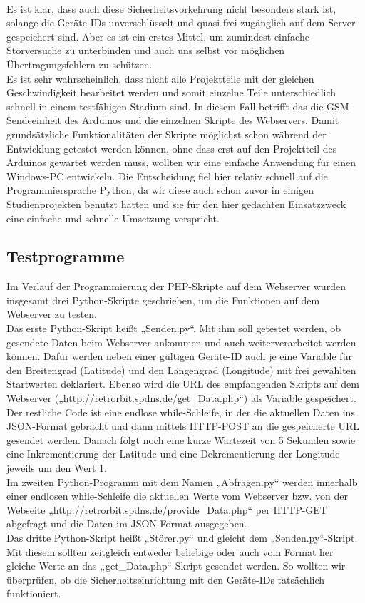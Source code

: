 \\
Es ist klar, dass auch diese Sicherheitsvorkehrung nicht besonders stark ist, solange die Geräte-IDs unverschlüsselt und quasi frei zugänglich auf dem Server gespeichert sind. Aber es ist ein erstes Mittel, um zumindest einfache Störversuche zu unterbinden und auch uns selbst vor möglichen Übertragungsfehlern zu schützen.
\\
Es ist sehr wahrscheinlich, dass nicht alle Projektteile mit der gleichen Geschwindigkeit bearbeitet werden und somit einzelne Teile unterschiedlich schnell in einem testfähigen Stadium sind. In diesem Fall betrifft das die GSM-Sendeeinheit des Arduinos und die einzelnen Skripte des Webservers. Damit grundsätzliche Funktionalitäten der Skripte möglichst schon während der Entwicklung getestet werden können, ohne dass erst auf den Projektteil des Arduinos gewartet werden muss, wollten wir eine einfache Anwendung für einen Windows-PC entwickeln. Die Entscheidung fiel hier relativ schnell auf die Programmiersprache Python, da wir diese auch schon zuvor in einigen Studienprojekten benutzt hatten und sie für den hier gedachten Einsatzzweck eine einfache und schnelle Umsetzung verspricht.

\subsection{Testprogramme}
Im Verlauf der Programmierung der PHP-Skripte auf dem Webserver wurden insgesamt drei Python-Skripte geschrieben, um die Funktionen auf dem Webserver zu testen.
\\
Das erste Python-Skript heißt „Senden.py“. Mit ihm soll getestet werden, ob gesendete Daten beim Webserver ankommen und auch weiterverarbeitet werden können. Dafür werden neben einer gültigen Geräte-ID auch je eine Variable für den Breitengrad (Latitude) und den Längengrad (Longitude) mit frei gewählten Startwerten deklariert. Ebenso wird die URL des empfangenden Skripts auf dem Webserver („http://retrorbit.spdns.de/get\_Data.php“) als Variable gespeichert. Der restliche Code ist eine endlose while-Schleife, in der die aktuellen Daten ins JSON-Format gebracht und dann mittels HTTP-POST an die gespeicherte URL gesendet werden. Danach folgt noch eine kurze Wartezeit von 5 Sekunden sowie eine Inkrementierung der Latitude und eine Dekrementierung der Longitude jeweils um den Wert 1.
\\
Im zweiten Python-Programm mit dem Namen „Abfragen.py“ werden innerhalb einer endlosen while-Schleife die aktuellen Werte vom Webserver bzw. von der Webseite „http://retrorbit.spdns.de/provide\_Data.php“ per HTTP-GET abgefragt und die Daten im JSON-Format ausgegeben.
\\
Das dritte Python-Skript heißt „Störer.py“ und gleicht dem „Senden.py“-Skript. Mit diesem sollten zeitgleich entweder beliebige oder auch vom Format her gleiche Werte an das „get\_Data.php“-Skript gesendet werden. So wollten wir überprüfen, ob die Sicherheitseinrichtung mit den Geräte-IDs tatsächlich funktioniert.

